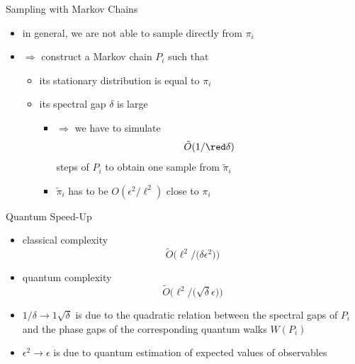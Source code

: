 \documentclass[slideColor]{prosper}
\renewcommand{\>}{\rangle}
\newcommand{\<}{\langle}
\begin{document}
\begin{slide}{Sampling with Markov Chains}
\begin{itemize}
\item in general, we are not able to sample directly from $\pi_i$ 

\medskip
\item $\Rightarrow$ construct a Markov chain $P_i$ such that 

\begin{itemize}
\item its stationary distribution is equal to $\pi_i$ 

\medskip
\item its spectral gap $\delta$ is large

\begin{itemize}
\item $\Rightarrow$ we have to simulate  
\[
\tilde{O}(1/ {\red \delta})
\] 
steps of $P_i$ to obtain one sample from $\tilde{\pi}_i$

\medskip
\item $\tilde{\pi}_i$ has to be $O(\epsilon^2/\ell^2)$ close to $\pi_i$
\end{itemize}

\end{itemize}

\end{itemize}
\end{slide}


\begin{slide}{Quantum Speed-Up}
\begin{itemize}
\item classical complexity
\[
\tilde{O}\Big(
\ell^2 /\big(\delta \epsilon^2\big) 
\Big)
\]

\item quantum complexity
\[
\tilde{O}\Big(
\ell^2/\big(\sqrt{\delta} \epsilon\big)
\Big)
\]

\item $1/\delta \rightarrow 1\sqrt{\delta}$ is due to the quadratic relation between the spectral gaps of $P_i$ and the phase gaps of the corresponding quantum walks $W(P_i)$ 

\medskip
\item $\epsilon^2 \rightarrow \epsilon$ is due to quantum estimation of expected values of observables
\end{itemize}
\end{slide}
\end{document}
